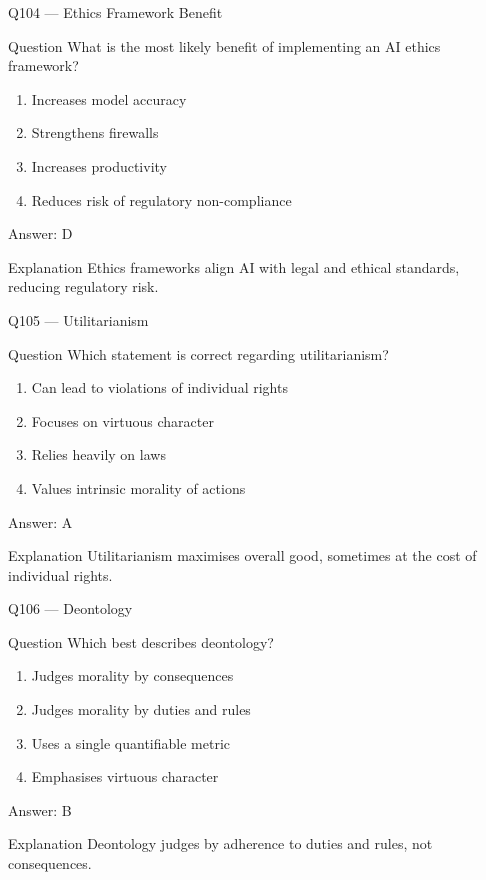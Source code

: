 \documentclass[aspectratio=169,8pt]{beamer}
\begin{document}
	\begin{frame}{Q104 --- Ethics Framework Benefit}
		\begin{block}{Question}
			What is the most likely benefit of implementing an AI ethics framework?
		\end{block}
		\begin{enumerate}
			\item Increases model accuracy
			\item Strengthens firewalls
			\item Increases productivity
			\item Reduces risk of regulatory non-compliance
		\end{enumerate}
		\begin{exampleblock}{Answer: D}\end{exampleblock}
		\begin{block}{Explanation}
			Ethics frameworks align AI with legal and ethical standards, reducing regulatory risk.
		\end{block}
	\end{frame}
	
	\begin{frame}{Q105 --- Utilitarianism}
		\begin{block}{Question}
			Which statement is correct regarding utilitarianism?
		\end{block}
		\begin{enumerate}
			\item Can lead to violations of individual rights
			\item Focuses on virtuous character
			\item Relies heavily on laws
			\item Values intrinsic morality of actions
		\end{enumerate}
		\begin{exampleblock}{Answer: A}\end{exampleblock}
		\begin{block}{Explanation}
			Utilitarianism maximises overall good, sometimes at the cost of individual rights.
		\end{block}
	\end{frame}
	
	\begin{frame}{Q106 --- Deontology}
		\begin{block}{Question}
			Which best describes deontology?
		\end{block}
		\begin{enumerate}
			\item Judges morality by consequences
			\item Judges morality by duties and rules
			\item Uses a single quantifiable metric
			\item Emphasises virtuous character
		\end{enumerate}
		\begin{exampleblock}{Answer: B}\end{exampleblock}
		\begin{block}{Explanation}
			Deontology judges by adherence to duties and rules, not consequences.
		\end{block}
	\end{frame}
	
\end{document}
